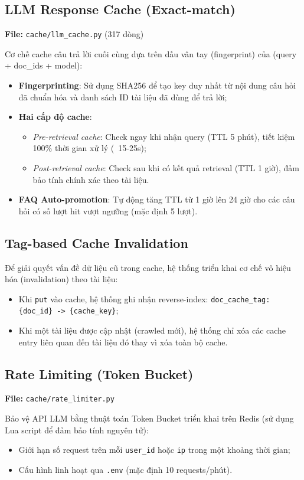 \documentclass[../DoAn.tex]{subfiles}
\begin{document}
\subsection{LLM Response Cache (Exact-match)}
\textbf{File:} \texttt{cache/llm\_cache.py} (317 dòng)

Cơ chế cache câu trả lời cuối cùng dựa trên dấu vân tay (fingerprint) của (query + doc\_ids + model):
\begin{itemize}
    \item \textbf{Fingerprinting}: Sử dụng SHA256 để tạo key duy nhất từ nội dung câu hỏi đã chuẩn hóa và danh sách ID tài liệu đã dùng để trả lời;
    \item \textbf{Hai cấp độ cache}: 
        \begin{itemize}
            \item \textit{Pre-retrieval cache}: Check ngay khi nhận query (TTL 5 phút), tiết kiệm 100\% thời gian xử lý (~15-25s);
            \item \textit{Post-retrieval cache}: Check sau khi có kết quả retrieval (TTL 1 giờ), đảm bảo tính chính xác theo tài liệu.
        \end{itemize}
    \item \textbf{FAQ Auto-promotion}: Tự động tăng TTL từ 1 giờ lên 24 giờ cho các câu hỏi có số lượt hit vượt ngưỡng (mặc định 5 lượt).
\end{itemize}

\subsection{Tag-based Cache Invalidation}
Để giải quyết vấn đề dữ liệu cũ trong cache, hệ thống triển khai cơ chế vô hiệu hóa (invalidation) theo tài liệu:
\begin{itemize}
    \item Khi \texttt{put} vào cache, hệ thống ghi nhận reverse-index: \texttt{doc\_cache\_tag:\{doc\_id\} -> \{cache\_key\}};
    \item Khi một tài liệu được cập nhật (crawled mới), hệ thống chỉ xóa các cache entry liên quan đến tài liệu đó thay vì xóa toàn bộ cache.
\end{itemize}

\subsection{Rate Limiting (Token Bucket)}
\textbf{File:} \texttt{cache/rate\_limiter.py}

Bảo vệ API LLM bằng thuật toán Token Bucket triển khai trên Redis (sử dụng Lua script để đảm bảo tính nguyên tử):
\begin{itemize}
    \item Giới hạn số request trên mỗi \texttt{user\_id} hoặc \texttt{ip} trong một khoảng thời gian;
    \item Cấu hình linh hoạt qua \texttt{.env} (mặc định 10 requests/phút).
\end{itemize}
\end{document}

